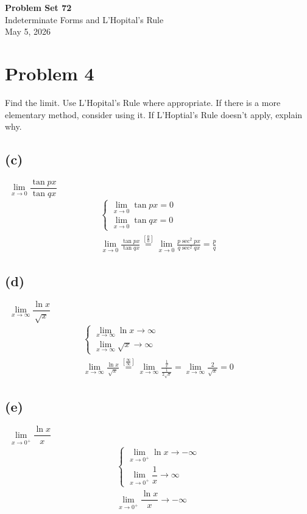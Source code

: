 \documentclass[12pt]{article}
\newcommand{\vem}{\vspace{0.5em}}
\newcommand{\problem}[1]{\section{Problem #1}}
\newcommand{\subproblem}[1]{\subsection{(#1)} \,}
\begin{document}
\vspace*{0cm}

\begin{center}
    {\Large \bfseries Problem Set 72} \\[0.5cm]
    {\large Indeterminate Forms and L'Hopital's Rule} \\[0.35cm]
    {\normalsize May 5, 2026}
\end{center}


\problem{4}
Find the limit. Use L'Hopital's Rule where appropriate. If there is a more elementary method, consider using it. If L'Hoptial's Rule doesn't apply, explain why.\vem

\subproblem{c}
$\lim\limits_{x\to 0} \dfrac{\tan px}{\tan qx}$
\begin{gather*}
    \begin{cases}
        \lim\limits_{x\to 0} \tan px=0\\
        \lim\limits_{x\to 0} \tan qx=0
    \end{cases}\\
    \lim\limits_{x\to 0}\frac{\tan px}{\tan qx}\overset{[\frac{0}{0}]}{=}\lim\limits_{x\to 0}\frac{p \sec^2 px}{q \sec^2 qx}=\boxed{\frac{p}{q}}
\end{gather*}

\subproblem{d}
$\lim\limits_{x\to \infty}\dfrac{\ln x}{\sqrt{x}}$
\begin{gather*}
    \begin{cases}
        \lim\limits_{x\to \infty}\ln x\to \infty\\
        \lim\limits_{x\to \infty}\sqrt{x} \to \infty
    \end{cases}\\
    \lim\limits_{x\to \infty}\frac{\ln x}{\sqrt{x}}\overset{[\frac{\infty{}}{\infty}]}{=}\lim\limits_{x\to \infty}\frac{\frac{1}{x}}{\frac{1}{2\sqrt{x}}}=\lim\limits_{x\to \infty}\frac{2}{\sqrt{x}}=\boxed{0}
\end{gather*}

\subproblem{e}
$\lim\limits_{x\to 0^+}\dfrac{\ln x}{x}$
\begin{gather*}
    \begin{cases}
        \lim\limits_{x\to 0^+}\ln x \to -\infty\\
        \lim\limits_{x\to 0^+}\dfrac{1}{x} \to \infty
    \end{cases}\\
    \lim\limits_{x\to 0^+}\dfrac{\ln x}{x}\to \boxed{-\infty}
\end{gather*}
\end{document}
